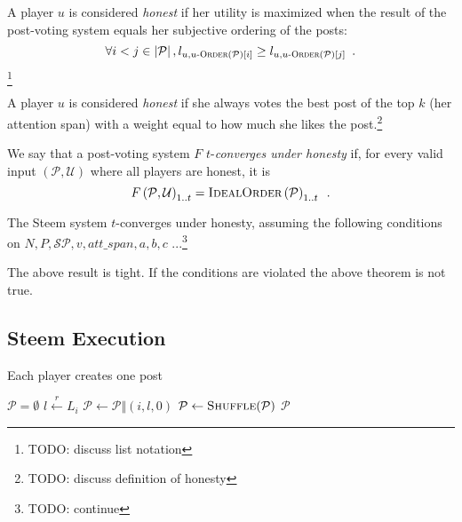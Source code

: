     \begin{definition}
      A player $u$ is considered \emph{honest} if her utility is maximized
      when the result of the post-voting system equals her subjective ordering
      of the posts:
      \begin{equation*}
        \forall i < j \in \left|\mathcal{P}\right|, l_{u, u\textsc{-Order}
        \left(\mathcal{P}\right)\left[i\right]} \geq l_{u, u\textsc{-Order}
        \left(\mathcal{P}\right)\left[j\right]}
        \enspace.
      \end{equation*}\footnote{TODO: discuss list notation}
    \end{definition}

    \begin{definition}
      A player $u$ is considered \emph{honest} if she always votes the best post
      of the top $k$ (her attention span) with a weight equal to how much she
      likes the post.\footnote{TODO: discuss definition of honesty}
    \end{definition}

    \begin{definition}
      We say that a post-voting system $F$ $t$-\emph{converges under honesty}
      if, for every valid input $\left(\mathcal{P}, \mathcal{U}\right)$ where
      all players are honest, it is
      \begin{equation*}
        F\left(\mathcal{P}, \mathcal{U}\right)_{1..t} =
        \textsc{IdealOrder}\left(\mathcal{P}\right)_{1..t} \enspace.
      \end{equation*}
    \end{definition}

    \begin{theorem}
      The Steem system $t$-converges under honesty, assuming the following
      conditions on $N, P, \mathcal{SP}, v, att\_span, a, b, c$
      ...\footnote{TODO: continue}
    \end{theorem}

    The above result is tight.
    If the conditions are violated the above theorem is not true.

  \subsection{Steem Execution}
    \begin{algorithm}
      \caption{Each player creates one post}
      \label{alg:postGen}
      \begin{algorithmic}[1]
        \State $\mathcal{P} = \emptyset$ 
           \State $l \xleftarrow{r} L_i$
           \State $\mathcal{P} \leftarrow \mathcal{P} \Vert \left(i, l, 0\right)$
        \EndFor
        \State $\mathcal{P} \leftarrow \textsc{Shuffle}(\mathcal{P})$
        \State \Return $\mathcal{P}$
      \EndFunction
      \end{algorithmic}
    \end{algorithm}


